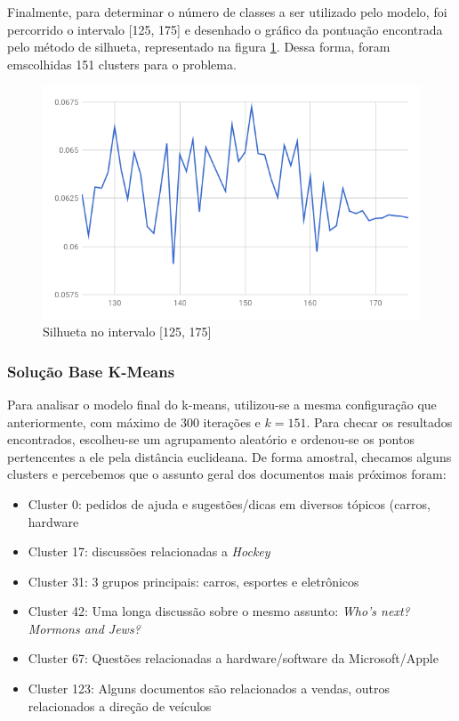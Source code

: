 \documentclass[conference]{IEEEtran}
\begin{document}
Finalmente, para determinar o número de classes a ser utilizado pelo modelo, foi percorrido o intervalo [125, 175] e desenhado o gráfico da pontuação encontrada pelo método de silhueta, representado na figura \ref{fig:sil2}. Dessa forma, foram emscolhidas 151 clusters para o problema. 

\begin{figure}[H]
  \includegraphics[scale=0.4, center]{silhouette2.png}
  \caption{Silhueta no intervalo [125, 175]}
  \label{fig:sil2}
\end{figure}

\subsubsection{Solução Base K-Means}
Para analisar o modelo final do k-means, utilizou-se a mesma configuração que anteriormente, com máximo de 300 iterações e $k=151$. Para checar os resultados encontrados, escolheu-se um agrupamento aleatório e ordenou-se os pontos pertencentes a ele pela distância euclideana. De forma amostral, checamos alguns clusters e percebemos que o assunto geral dos documentos mais próximos foram:

\begin{itemize}
\item Cluster 0: pedidos de ajuda e sugestões/dicas em diversos tópicos (carros, hardware
\item Cluster 17: discussões relacionadas a \textit{Hockey}
\item Cluster 31: 3 grupos principais: carros, esportes e eletrônicos
\item Cluster 42: Uma longa discussão sobre o mesmo assunto: \textit{Who's next? Mormons and Jews?}
\item Cluster 67: Questões relacionadas a hardware/software da Microsoft/Apple
\item Cluster 123: Alguns documentos são relacionados a vendas, outros relacionados a direção de veículos
\end{itemize}
\end{document}
